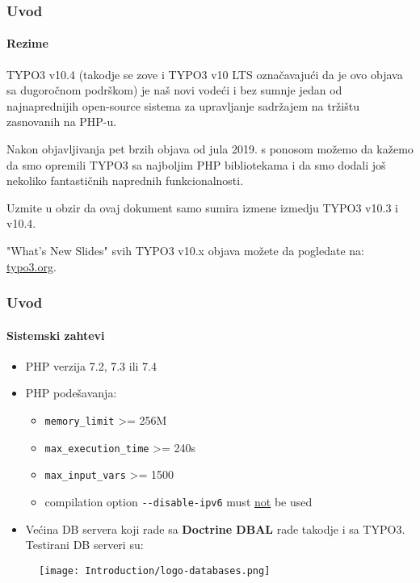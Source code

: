 \begin{frame}[fragile]
	\frametitle{Uvod}
	\framesubtitle{Rezime}

	\small
		TYPO3 v10.4 (takodje se zove i TYPO3 v10 LTS označavajući da je ovo objava sa dugoročnom podrškom)
		je naš novi vodeći i bez sumnje jedan od najnaprednijih open-source sistema za upravljanje sadržajem
		na tržištu zasnovanih na PHP-u.

		\vspace{0.2cm}

		Nakon objavljivanja pet brzih objava od jula 2019. s ponosom možemo da kažemo
		da smo opremili TYPO3 sa najboljim PHP bibliotekama i da smo dodali još nekoliko
		fantastičnih naprednih funkcionalnosti.

		\vspace{0.2cm}

		Uzmite u obzir da ovaj dokument samo sumira izmene izmedju TYPO3 v10.3 i v10.4.

		\vspace{0.2cm}

		"What's New Slides" svih TYPO3 v10.x objava možete da pogledate na:
		\href{https://typo3.org/help/documentation/whats-new/}{typo3.org}.

	\normalsize

\end{frame}


\begin{frame}[fragile]
	\frametitle{Uvod}
	\framesubtitle{Sistemski zahtevi}

	\begin{itemize}
		\item PHP verzija 7.2, 7.3 ili 7.4
		\item PHP podešavanja:

			\begin{itemize}
				\item \texttt{memory\_limit} >= 256M
				\item \texttt{max\_execution\_time} >= 240s
				\item \texttt{max\_input\_vars} >= 1500
				\item compilation option \texttt{-}\texttt{-disable-ipv6} must \underline{not} be used
			\end{itemize}

			\item Većina DB servera koji rade sa \textbf{Doctrine DBAL} rade takodje i sa TYPO3.
				Testirani DB serveri su:
	\end{itemize}

	\begin{figure}
		\texttt{[image: Introduction/logo-databases.png]}
	\end{figure}

\end{frame}

